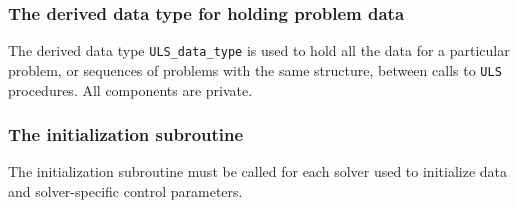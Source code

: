 \documentclass{galahad}
\newcommand{\packagename}{ULS}
\begin{document}

\subsubsection{The derived data type for holding problem data}\label{typedata}
The derived data type
{\tt \packagename\_data\_type}
is used to hold all the data for a particular problem,
or sequences of problems with the same structure, between calls to
{\tt \packagename} procedures.
All components are private.


\galarguments


\subsubsection{The initialization subroutine}\label{subinit}
The initialization subroutine must be called for each solver used
to initialize data and solver-specific control parameters.
\end{document}
